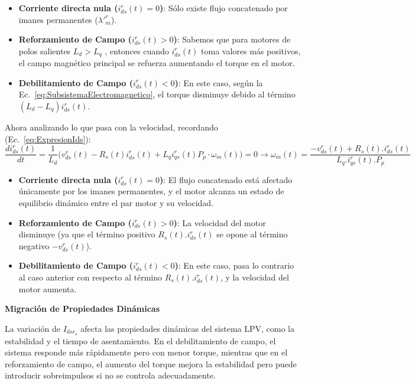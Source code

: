 \documentclass{article}
\begin{document}
\begin{itemize}
    \item \textbf{Corriente directa nula (\(i^r_{ds}(t) = 0\))}: Sólo existe flujo concatenado por imanes permanentes (\(\lambda'^r_m\)).
    
    \item \textbf{Reforzamiento de Campo (\(i^r_{ds}(t) > 0\))}: Sabemos que para motores de polos salientes \(L_d > L_q\) , entonces cuando \(i^r_{ds}(t)\) toma valores más positivos, el campo
    magnético principal se refuerza aumentando el torque en el motor. 
    
    \item \textbf{Debilitamiento de Campo (\(i^r_{ds}(t) < 0\))}: En este caso, según la Ec.~\ref{eq:SubsistemaElectromagnetico}, el torque disminuye debido al término \((L_d - L_q)i^r_{ds}(t)\).
\end{itemize}

Ahora analizando lo que pasa con la velocidad, recordando (Ec.~\ref{eq:ExpresionIds}):
 \begin{equation*}
     \frac{d i_{ds}^r(t)}{dt} = \frac{1}{L_d} \Big( v_{ds}^r(t) - R_s(t) i_{ds}^r(t) + L_q i_{qs}^r(t) P_p \cdot \omega_m(t) \Big) = 0 \rightarrow \omega_m(t) = \frac{-v^r_{ds}(t) + R_s(t).i^r_{ds}(t)}{L_q.i^r_{qs}(t).P_p}
 \end{equation*}

\begin{itemize}
    \item \textbf{Corriente directa nula (\(i^r_{ds}(t) = 0\))}: El flujo concatenado está afectado únicamente por los imanes permanentes, y el motor alcanza un estado de equilibrio dinámico entre el par motor y su velocidad.
    
    \item \textbf{Reforzamiento de Campo (\(i^r_{ds}(t) > 0\))}: La velocidad del motor disminuye (ya que el término positivo $R_s(t).i^r_{ds}(t)$ se opone al término negativo $-v^r_{ds}(t)$). 
    
    \item \textbf{Debilitamiento de Campo (\(i^r_{ds}(t) < 0\))}: En este caso, pasa lo contrario al caso anterior con respecto al término $R_s(t).i^r_{ds}(t)$, y la velocidad del motor aumenta.
\end{itemize}


\textbf{Migración de Propiedades Dinámicas}

La variación de \(I_{dsr_o}\) afecta las propiedades dinámicas del sistema LPV, como la estabilidad y el tiempo de asentamiento. En el debilitamiento de campo, el sistema responde más rápidamente pero con menor torque, mientras que en el reforzamiento de campo, el aumento del torque mejora la estabilidad pero puede introducir sobreimpulsos si no se controla adecuadamente.\\
\end{document}
